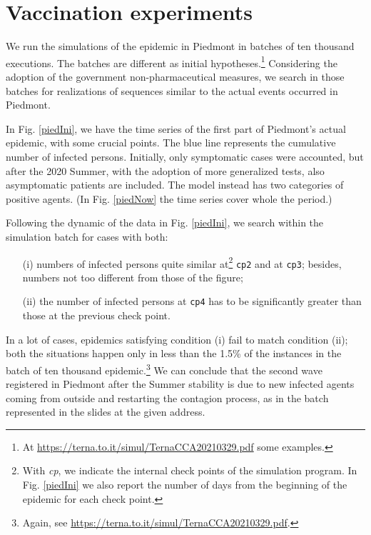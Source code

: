 \documentclass[graybox]{svmult}
\begin{document}
\section{Vaccination experiments}
\label{experiments}



We run the simulations of the epidemic in Piedmont in batches of ten thousand executions. The batches are different as initial hypotheses.\footnote{At \url{https://terna.to.it/simul/TernaCCA20210329.pdf} some examples.} Considering the adoption of the government non-pharmaceutical measures, we search in those batches for realizations of sequences similar to the actual events occurred in Piedmont.

In Fig. \ref{piedIni}, we have the time series of the first part of Piedmont's actual epidemic, with some crucial points. The blue line represents the cumulative number of infected persons. Initially, only symptomatic cases were accounted, but after the 2020 Summer, with the adoption of more generalized tests, also asymptomatic patients are included. The model instead has two categories of positive agents. (In Fig. \ref{piedNow} the time series cover whole the period.)

Following the dynamic of the data in Fig. \ref{piedIni}, we search within the simulation batch for  cases with both:
\begin{itemize}
\item [(i)] numbers of infected persons quite similar at\footnote{With \emph{cp}, we indicate the internal check points of the simulation program. In Fig. \ref{piedIni} we also report the number of days from the beginning of the epidemic for each check point.}  \verb|cp2| and at \verb|cp3|; besides, numbers not too different from those of the figure;

\item [(ii)] the number of infected persons at \verb|cp4| has to be significantly greater than those at the previous check point.

\end{itemize}

In a lot of cases, epidemics satisfying condition (i) fail to match condition (ii); both the situations happen only in less than the 1.5\% of the instances in the batch of ten thousand epidemic.\footnote{Again, see  \url{https://terna.to.it/simul/TernaCCA20210329.pdf}.} We can conclude that the second wave registered in Piedmont after the Summer stability is due to new infected agents coming from outside and restarting the contagion process, as in the batch represented in the slides at the given address.
\end{document}
